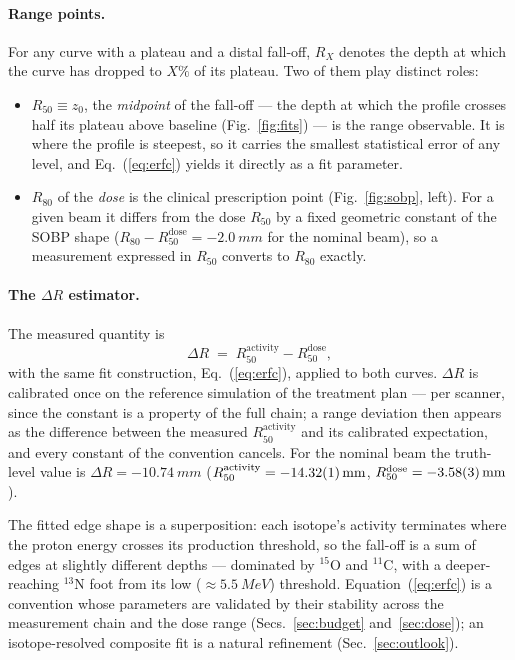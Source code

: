 \documentclass[11pt]{article}
\newcommand{\Rfifty}{R_{50}}
\newcommand{\DR}{\Delta R}
\begin{document}
\paragraph{Range points.} For any curve with a plateau and a distal
fall-off, $R_X$ denotes the depth at which the curve has dropped to $X\%$
of its plateau. Two of them play distinct roles:
\begin{itemize}
\item $\Rfifty \equiv z_0$, the \emph{midpoint} of the fall-off --- the
  depth at which the profile crosses half its plateau above baseline
  (Fig.~\ref{fig:fits}) --- is the range observable. It is where the
  profile is steepest, so it carries the smallest statistical error of any
  level, and Eq.~(\ref{eq:erfc}) yields it directly as a fit parameter.
\item $R_{80}$ of the \emph{dose} is the clinical prescription point
  (Fig.~\ref{fig:sobp}, left). For a given beam it differs from the dose
  $\Rfifty$ by a fixed geometric constant of the SOBP shape
  ($R_{80}-\Rfifty^{\text{dose}} = \SI{-2.0}{mm}$ for the nominal beam), so
  a measurement expressed in $\Rfifty$ converts to $R_{80}$ exactly.
\end{itemize}

\paragraph{The $\DR$ estimator.} The measured quantity is
\begin{equation}
  \DR \;=\; \Rfifty^{\text{activity}} - \Rfifty^{\text{dose}},
  \label{eq:dr}
\end{equation}
with the same fit construction, Eq.~(\ref{eq:erfc}), applied to both
curves. $\DR$ is calibrated once on the reference simulation of the
treatment plan --- per scanner, since the constant is a property of the
full chain; a range deviation then appears as the difference between the
measured $\Rfifty^{\text{activity}}$ and its calibrated expectation, and
every constant of the convention cancels. For the nominal beam the
truth-level value is $\DR = \SI{-10.74}{mm}$
($\Rfifty^{\text{activity}} = \SI{-14.32 \pm 0.01}{mm}$,
$\Rfifty^{\text{dose}} = \SI{-3.58 \pm 0.03}{mm}$).

The fitted edge shape is a superposition: each isotope's activity
terminates where the proton energy crosses its production threshold, so
the fall-off is a sum of edges at slightly different depths --- dominated
by $^{15}$O and $^{11}$C, with a deeper-reaching $^{13}$N foot from its
low ($\approx\SI{5.5}{MeV}$) threshold. Equation~(\ref{eq:erfc}) is a
convention whose parameters are validated by their stability across the
measurement chain and the dose range (Secs.~\ref{sec:budget}
and~\ref{sec:dose}); an isotope-resolved composite fit is a natural
refinement (Sec.~\ref{sec:outlook}).
\end{document}
